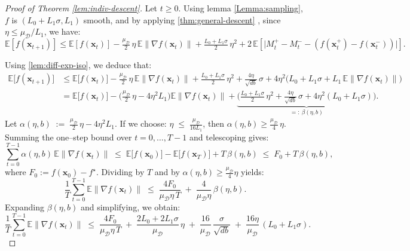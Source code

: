 \documentclass[twoside]{article}
\theoremstyle{plain}
\theoremstyle{definition}
\theoremstyle{remark}
\def\cD{{\mathcal{D}}}
\def\vx{{\bm{x}}}
\newcommand{\E}{\mathbb{E}}
\begin{document}
\begin{proof}[Proof of Theorem \ref{lem:indiv-descent}]
Let $t\ge 0$. Using lemma \ref{Lemma:sampling},
   $f$ is $(L_0+L_1\sigma,L_1)$ smooth, and by applying \cref{thm:general-descent} , since $\eta\le\mu_\cD/L_1$, we have:
$$
\E[f(\vx_{t+1})]
\le
\E[f(\vx_t)]
- \tfrac{\mu_{\cD}}{2}\,\eta\,\E\|\nabla f(\vx_t)\|
+ \tfrac{L_0+L_1\sigma}{2}\,\eta^2
+ 2\,\E\!\left[
    \big|
        M_t^+ - M_t^- - (f(\vx_t^+) - f(\vx_t^-))
    \big|
\right].    
      $$
      
      
   Using \cref{lem:diff-exp-iso}, we deduce that:
\begin{align*}
\mathbb{E}\big[f(\vx_{t+1})\big]
&\le
\mathbb{E}\big[f(\vx_t)\big]
- \tfrac{\mu_{\mathcal{D}}}{2}\,\eta\,\mathbb{E}\big\|\nabla f(\vx_t)\big\|
+ \tfrac{L_0+L_1\sigma}{2}\,\eta^2
+ \frac{4\eta}{\sqrt{db}}\,\sigma
+ 4\eta^2\Big(L_0+L_1\sigma+L_1\,\mathbb{E}\big\|\nabla f(\vx_t)\big\|\Big)\\
&=
\mathbb{E}\big[f(\vx_t)\big]
-\Big(\tfrac{\mu_{\mathcal{D}}}{2}\,\eta-4\eta^2 L_1\Big)\mathbb{E}\big\|\nabla f(\vx_t)\big\|
+ \underbrace{\Big(\tfrac{L_0+L_1 \sigma}{2}\,\eta^2+\tfrac{4\eta}{\sqrt{db}}\,\sigma+4\eta^2(L_0+L_1\sigma)\Big)}_{=:~\beta(\eta,b)}.
\end{align*}
Let
$
\alpha(\eta,b)\;:=\;\tfrac{\mu_{\mathcal{D}}}{2}\,\eta-4\eta^2 L_1.$
If we choose:
$
\eta \;\le\;\frac{\mu_{\mathcal{D}}}{16L_1}
$,
then $\alpha(\eta,b)\ge \tfrac{\mu_{\mathcal{D}}}{4}\,\eta$. Summing the one–step bound over $t=0,\ldots,T-1$ and telescoping gives:
\[
\sum_{t=0}^{T-1}\alpha(\eta,b)\,\mathbb{E}\big\|\nabla f(\vx_t)\big\|
\;\le\; \mathbb{E}\big[f(\vx_0)\big]-\mathbb{E}\big[f(\vx_T)\big] + T\,\beta(\eta,b)
\;\le\; F_0 + T\,\beta(\eta,b),
\]
where $F_0:=f(\vx_0)-f^\star$. Dividing by $T$ and by $\alpha(\eta,b)\ge \frac{\mu_{\mathcal{D}}}{4}\eta$ yields:
\[
\frac{1}{T}\sum_{t=0}^{T-1}\mathbb{E}\big\|\nabla f(\vx_t)\big\|
\;\le\;
\frac{4F_0}{\mu_{\mathcal{D}}\eta\,T}
\;+\;\frac{4}{\mu_{\mathcal{D}}\eta}\,\beta(\eta,b).
\]
Expanding $\beta(\eta,b)$ and simplifying, we obtain:
\[
\frac{1}{T}\sum_{t=0}^{T-1}\mathbb{E}\big\|\nabla f(\vx_t)\big\|
\;\le\;
\frac{4F_0}{\mu_{\mathcal{D}}\eta\,T}
\;+\;\frac{2L_0+2L_1 \sigma}{\mu_{\mathcal{D}}}\,\eta
\;+\;\frac{16}{\mu_{\mathcal{D}}}\,\frac{\sigma}{\sqrt{db}}
\;+\;\frac{16\eta}{\mu_{\mathcal{D}}}\,(L_0+L_1\sigma).
\]
\end{proof}
\end{document}
